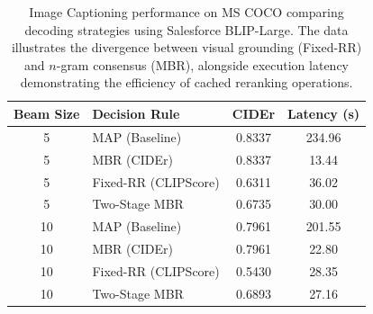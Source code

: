 \begin{table}[htbp]
\centering
\caption{Image Captioning performance on MS COCO comparing decoding strategies using Salesforce BLIP-Large. The data illustrates the divergence between visual grounding (Fixed-RR) and $n$-gram consensus (MBR), alongside execution latency demonstrating the efficiency of cached reranking operations.}
\label{tab:caption_results_empirical}
\begin{tabular}{clcc}
\toprule
\textbf{Beam Size} & \textbf{Decision Rule} & \textbf{CIDEr} & \textbf{Latency (s)} \\
\midrule
5 & MAP (Baseline) & 0.8337 & 234.96 \\
5 & MBR (CIDEr) & 0.8337 & 13.44 \\
5 & Fixed-RR (CLIPScore) & 0.6311 & 36.02 \\
5 & Two-Stage MBR & 0.6735 & 30.00 \\
\midrule
10 & MAP (Baseline) & 0.7961 & 201.55 \\
10 & MBR (CIDEr) & 0.7961 & 22.80 \\
10 & Fixed-RR (CLIPScore) & 0.5430 & 28.35 \\
10 & Two-Stage MBR & 0.6893 & 27.16 \\
\bottomrule
\end{tabular}
\end{table}
